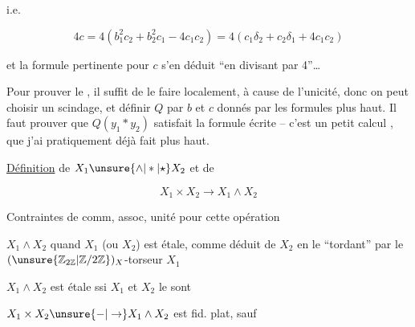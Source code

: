 

i.e.

\[ 4c=4\left(b_1^2c_2+b_2^2c_1-4c_1c_2\right)=4(c_1\delta_2+c_2\delta_1+4c_1c_2) \]


et la formule pertinente pour $c$ s'en déduit ``en divisant par 4''\ldots

Pour prouver le , il suffit de le faire localement, à cause de l'unicité, donc on peut choisir un scindage, et définir $Q$  par $b$ et $c$ donnés par les formules plus haut. Il faut prouver que $Q(y_1*y_2)$ satisfait la formule écrite -- c'est un petit calcul , que j'ai pratiquement déjà fait plus haut.

\uline{Définition} de $X_1\unsure{\wedge|*|\star}X_2$ et de

\[ X_1\times X_2\longrightarrow X_1\wedge X_2 \]

Contraintes de comm, assoc, unité pour cette opération

$X_1\wedge X_2$ quand $X_1$ (ou $X_2$) est étale, comme déduit de $X_2$ en le ``tordant'' par le $(\unsure{\mathbb{Z}_{2\mathbb Z}|\mathbb Z/2\mathbb Z})_X$-torseur $X_1$

$X_1\wedge X_2$ est étale ssi $X_1$ et $X_2$ le sont

$X_1\times X_2\unsure{-|\to}X_1\wedge X_2$ est fid. plat, sauf
